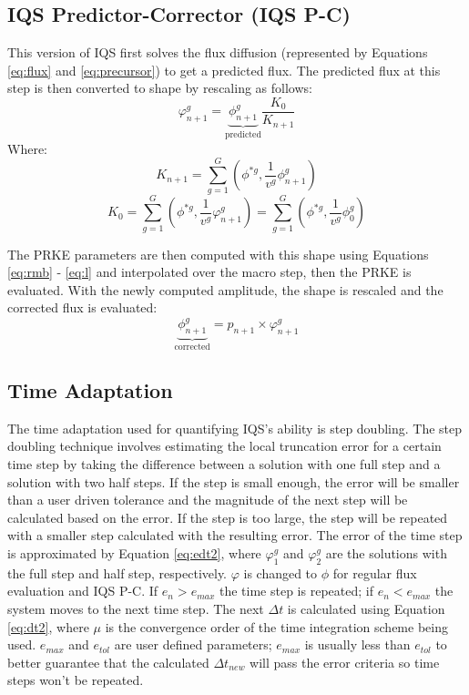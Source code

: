 \documentclass{anstrans}
\newcommand{\be}{\begin{equation}}
\newcommand{\ee}{\end{equation}}
\begin{document}
\subsection{IQS Predictor-Corrector (IQS P-C)}

This version of IQS first solves the flux diffusion (represented by Equations \ref{eq:flux} and \ref{eq:precursor}) to get a predicted flux.  The predicted flux at this step is then converted to shape by rescaling as follows:
\be
\varphi^g_{n+1} = \underbrace{\phi^g_{n+1}}_{\text{predicted}} \frac{K_0}{K_{n+1}}
\label{eq:rescale}
\ee
Where:
\be
K_{n+1} =\sum_{g=1}^G\left(\phi^{*g},\frac{1}{v^g}\phi^g_{n+1}\right)
\ee
\be
K_{0} =\sum_{g=1}^G\left(\phi^{*g},\frac{1}{v^g}\varphi^g_{n+1}\right)=\sum_{g=1}^G\left(\phi^{*g},\frac{1}{v^g}\phi^g_{0}\right)
\ee

The PRKE parameters are then computed with this shape using Equations \ref{eq:rmb} - \ref{eq:l} and interpolated over the macro step, then the PRKE is evaluated.  With the newly computed amplitude, the shape is rescaled and the corrected flux is evaluated:
\be
\underbrace{\phi^g_{n+1}}_{\text{corrected}} = p_{n+1} \times \varphi^g_{n+1}
\ee

\subsection{Time Adaptation}

The time adaptation used for quantifying IQS's ability is step doubling.  The step doubling technique involves estimating the local truncation error for a certain time step by taking the difference between a solution with one full step and a solution with two half steps.  If the step is small enough, the error will be smaller than a user driven tolerance and the magnitude of the next step will be calculated based on the error.  If the step is too large, the step will be repeated with a smaller step calculated with the resulting error.  The error of the time step is approximated by Equation \ref{eq:edt2}, where $\varphi^g_1$ and $\varphi^g_2$ are the solutions with the full step and half step, respectively.  $\varphi$ is changed to $\phi$ for regular flux evaluation and IQS P-C.  If $e_n > e_{max}$ the time step is repeated; if $e_n < e_{max}$ the system moves to the next time step.  The next $\Delta t$ is calculated using Equation \ref{eq:dt2}, where $\mu$ is the convergence order of the time integration scheme being used.  $e_{max}$ and $e_{tol}$ are user defined parameters; $e_{max}$ is usually less than $e_{tol}$ to better guarantee that the calculated $\Delta t_{new}$ will pass the error criteria so time steps won't be repeated.
\end{document}
